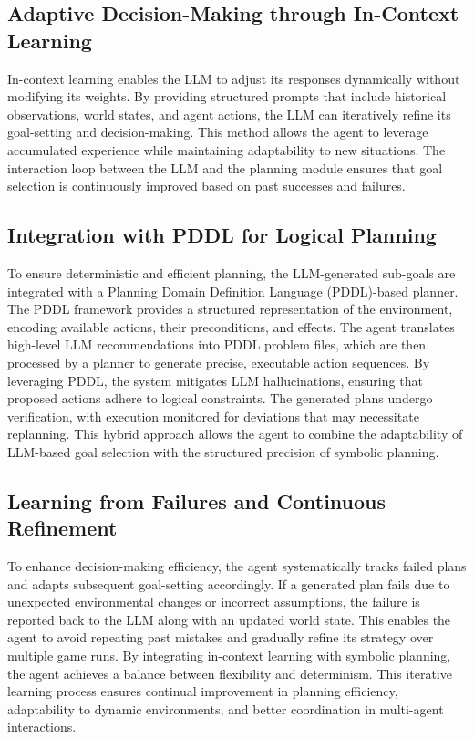 \documentclass{article}
\begin{document}
\subsection{Adaptive Decision-Making through In-Context Learning}
In-context learning enables the LLM to adjust its responses dynamically without modifying its weights. 
By providing structured prompts that include historical observations, world states, and agent actions, 
the LLM can iteratively refine its goal-setting and decision-making. 
This method allows the agent to leverage accumulated experience while maintaining adaptability to new situations. 
The interaction loop between the LLM and the planning module ensures that goal selection is continuously improved based on past successes and failures.

\subsection{Integration with PDDL for Logical Planning}
To ensure deterministic and efficient planning, the LLM-generated sub-goals are integrated with a Planning Domain Definition Language (PDDL)-based planner. 
The PDDL framework provides a structured representation of the environment, encoding available actions, their preconditions, and effects. 
The agent translates high-level LLM recommendations into PDDL problem files,
which are then processed by a planner to generate precise, executable action sequences.
By leveraging PDDL, the system mitigates LLM hallucinations, ensuring that proposed actions adhere to logical constraints. 
The generated plans undergo verification, with execution monitored for deviations that may necessitate replanning. 
This hybrid approach allows the agent to combine the adaptability of LLM-based goal selection with the structured precision of symbolic planning.

\subsection{Learning from Failures and Continuous Refinement}
To enhance decision-making efficiency, the agent systematically tracks failed plans and adapts subsequent goal-setting accordingly. 
If a generated plan fails due to unexpected environmental changes or incorrect assumptions, 
the failure is reported back to the LLM along with an updated world state. 
This enables the agent to avoid repeating past mistakes and gradually refine its strategy over multiple game runs.
By integrating in-context learning with symbolic planning, the agent achieves a balance between flexibility and determinism. 
This iterative learning process ensures continual improvement in planning efficiency, adaptability to dynamic environments, 
and better coordination in multi-agent interactions.
\end{document}
